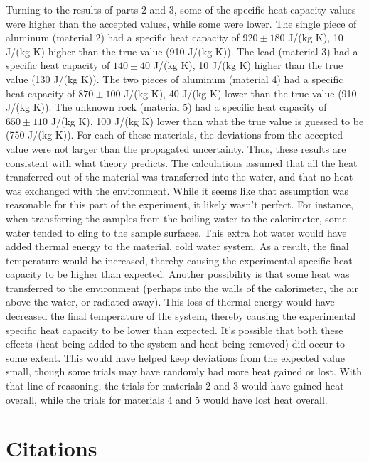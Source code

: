 \documentclass[12pt]{iopart} %
\begin{document}
Turning to the results of parts 2 and 3, some of the specific heat capacity values were higher than the accepted values, while some were lower.
The single piece of aluminum (material 2) had a specific heat capacity of $920 \pm 180$ J/(kg K), 10 J/(kg K) higher than the true value (910 J/(kg K)).
The lead (material 3) had a specific heat capacity of $140 \pm 40$ J/(kg K), 10 J/(kg K) higher than the true value (130 J/(kg K)).
The two pieces of aluminum (material 4) had a specific heat capacity of $870 \pm 100$ J/(kg K), 40 J/(kg K) lower than the true value (910 J/(kg K)).
The unknown rock (material 5) had a specific heat capacity of $650 \pm 110$ J/(kg K), 100 J/(kg K) lower than what the true value is guessed to be (750 J/(kg K)).
For each of these materials, the deviations from the accepted value were not larger than the propagated uncertainty.
Thus, these results are consistent with what theory predicts.
The calculations assumed that all the heat transferred out of the material was transferred into the water, and that no heat was exchanged with the environment.
While it seems like that assumption was reasonable for this part of the experiment, it likely wasn't perfect.
For instance, when transferring the samples from the boiling water to the calorimeter, some water tended to cling to the sample surfaces.
This extra hot water would have added thermal energy to the material, cold water system.
As a result, the final temperature would be increased, thereby causing the experimental specific heat capacity to be higher than expected.
Another possibility is that some heat was transferred to the environment (perhaps into the walls of the calorimeter, the air above the water, or radiated away).
This loss of thermal energy would have decreased the final temperature of the system, thereby causing the experimental specific heat capacity to be lower than expected.
It's possible that both these effects (heat being added to the system and heat being removed) did occur to some extent.
This would have helped keep deviations from the expected value small, though some trials may have randomly had more heat gained or lost.
With that line of reasoning, the trials for materials 2 and 3 would have gained heat overall, while the trials for materials 4 and 5 would have lost heat overall.

\section{Citations}
\end{document}
